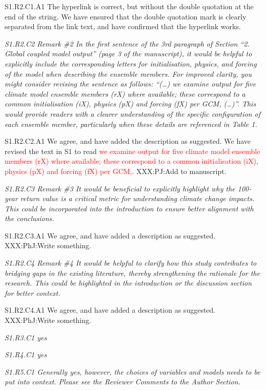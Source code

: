 \documentclass[a4paper,10pt]{article}
\newcommand{\ed}[1]{\textcolor{red}{#1}}
\begin{document}
	S1.R2.C1.A1 The hyperlink is correct, but without the double quotation at the end of the string. We have ensured that the double quotation mark is clearly separated from the link text, and have confirmed that the hyperlink works.
		
	\emph{S1.R2.C2 Remark \#2 In the first sentence of the 3rd paragraph of Section “2. Global coupled model output” (page 3 of the manuscript), it would be helpful to explicitly include the corresponding letters for initialisation, physics, and forcing of the model when describing the ensemble members. For improved clarity, you might consider revising the sentence as follows: “(…) we examine output for five climate model ensemble members (rX) where available; these correspond to a common initialisation (iX), physics (pX) and forcing (fX) per GCM, (…)”. This would provide readers with a clearer understanding of the specific configuration of each ensemble member, particularly when these details are referenced in Table 1.}
	
	S1.R2.C2.A1 We agree, and have added the description as suggested. We have revised the text in S1 to read \ed{we examine output for five climate model ensemble members (rX) where available; these correspond to a common initialisation (iX), physics (pX) and forcing (fX) per GCM,}. XXX:PJ:Add to manuscript.
	
	\emph{S1.R2.C3 Remark \#3 It would be beneficial to explicitly highlight why the 100-year return value is a critical metric for understanding climate change impacts. This could be incorporated into the introduction to ensure better alignment with the conclusions.}
	
	S1.R2.C3.A1 We agree, and have added a description as suggested. XXX:PhJ:Write something.

	\emph{S1.R2.C4 Remark \#4 It would be helpful to clarify how this study contributes to bridging gaps in the existing literature, thereby strengthening the rationale for the research. This could be highlighted in the introduction or the discussion section for better context.}
	
	S1.R2.C4.A1 We agree, and have added a description as suggested. XXX:PhJ:Write something.

	\emph{S1.R3.C1 yes}

	\emph{S1.R4.C1 yes}

	\emph{S1.R5.C1 Generally yes, however, the choices of variables and models needs to be put into context. Please see the Reviewer Comments to the Author Section.}
	
\end{document}
